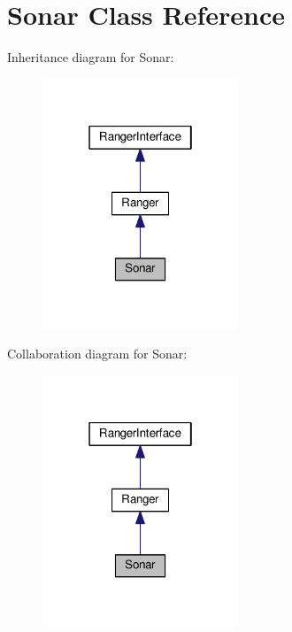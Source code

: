 \hypertarget{classSonar}{}\section{Sonar Class Reference}
\label{classSonar}


Inheritance diagram for Sonar\+:
\nopagebreak
\begin{figure}[H]
\begin{center}
\leavevmode
\includegraphics[width=166pt]{classSonar__inherit__graph}
\end{center}
\end{figure}


Collaboration diagram for Sonar\+:
\nopagebreak
\begin{figure}[H]
\begin{center}
\leavevmode
\includegraphics[width=166pt]{classSonar__coll__graph}
\end{center}
\end{figure}
